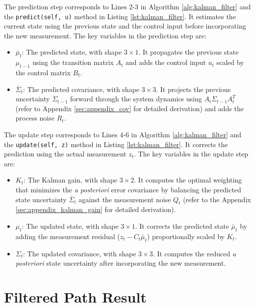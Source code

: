 \documentclass{article}
\begin{document}
The prediction step corresponds to Lines 2-3 in Algorithm \ref{alg:kalman_filter} and the \texttt{predict(self, u)} method in Listing \ref{lst:kalman_filter}.
It estimates the current state using the previous state and the control input before incorporating the new measurement.
The key variables in the prediction step are:

\begin{itemize}
    \item $\bar{\mu}_t$: The predicted state, with shape $3 \times 1$. It propagates the previous state $\mu_{t-1}$ using the transition matrix $A_t$ and adds the control input $u_t$ scaled by the control matrix $B_t$.
    \item $\bar{\Sigma}_t$: The predicted covariance, with shape $3 \times 3$. It projects the previous uncertainty $\Sigma_{t-1}$ forward through the system dynamics using $A_t \Sigma_{t-1} A_t^T$ (refer to Appendix \ref{sec:appendix_cov} for detailed derivation) and adds the process noise $R_t$.
\end{itemize}

The update step corresponds to Lines 4-6 in Algorithm \ref{alg:kalman_filter} and the \texttt{update(self, z)} method in Listing \ref{lst:kalman_filter}.
It corrects the prediction using the actual measurement $z_t$.
The key variables in the update step are:

\begin{itemize}
    \item $K_t$: The Kalman gain, with shape $3 \times 2$. It computes the optimal weighting that minimizes the \textit{a posteriori} error covariance by balancing the predicted state uncertainty $\bar{\Sigma}_t$ against the measurement noise $Q_t$ (refer to the Appendix \ref{sec:appendix_kalman_gain} for detailed derivation).
    \item $\mu_t$: The updated state, with shape $3 \times 1$. It corrects the predicted state $\bar{\mu}_t$ by adding the measurement residual ($z_t - C_t \bar{\mu}_t$) proportionally scaled by $K_t$.
    \item $\Sigma_t$: The updated covariance, with shape $3 \times 3$. It computes the reduced \textit{a posteriori} state uncertainty after incorporating the new measurement.
\end{itemize}

\section{Filtered Path Result}
\end{document}

